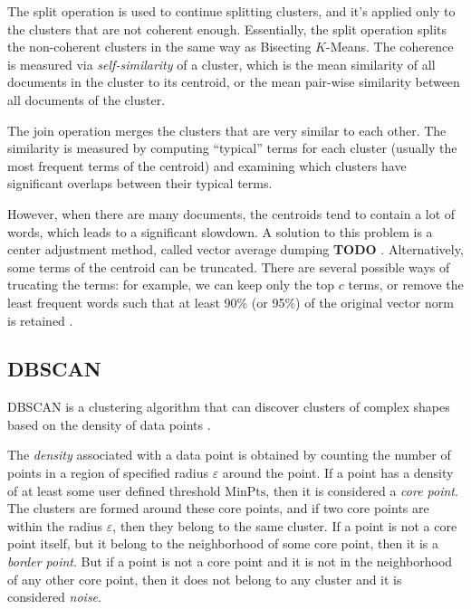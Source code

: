 The split operation is used to continue splitting clusters,
and it's applied only to the clusters that are not coherent 
enough. Essentially, the split operation splits the non-coherent
clusters in the same way as Bisecting $K$-Means. 
The coherence is measured via \emph{self-similarity} of a cluster,
which is the mean similarity of all documents in the cluster to 
its centroid, or the mean pair-wise similarity between all documents 
of the cluster. 

The join operation merges the clusters that are very similar 
to each other. The similarity is measured by computing ``typical''
terms for each cluster (usually the most frequent terms of 
the centroid) and examining which clusters have significant
overlaps between their typical terms. 


However, when there are many documents, the centroids tend 
to contain a lot of words, which leads to a significant slowdown. 
A solution to this problem is a center adjustment method, called
vector average dumping \textbf{TODO} \cite{larsen1999fast}. 
Alternatively, some terms of the centroid can be 
truncated. There are several possible ways of trucating
the terms: for example, we can keep only the top $c$ terms, or
remove the least frequent words such that at least 90\% (or 95\%) of 
the original vector norm is retained \cite{schutze1997projections}.



\subsection{DBSCAN} \label{sec:dbscan}


DBSCAN is a clustering algorithm that can discover 
clusters of complex shapes based on the density of 
data points \cite{ester1996density}. 

The \emph{density} associated with a data point is obtained by 
counting the number of points in a region of specified radius $\varepsilon$
around the point. If a point has a density of at least some user defined 
threshold $\text{MinPts}$, then it is considered a \emph{core point}. 
The clusters are formed around these core points, and if two core points 
are within the radius $\varepsilon$, then they belong to the same cluster. 
If a point is not a core point itself, but it belong to the neighborhood of some 
core point, then it is a \emph{border point}. But if a point is not a core point 
and it is not in the neighborhood of any other core point, then it does not 
belong to any cluster and it is considered \emph{noise}. 

